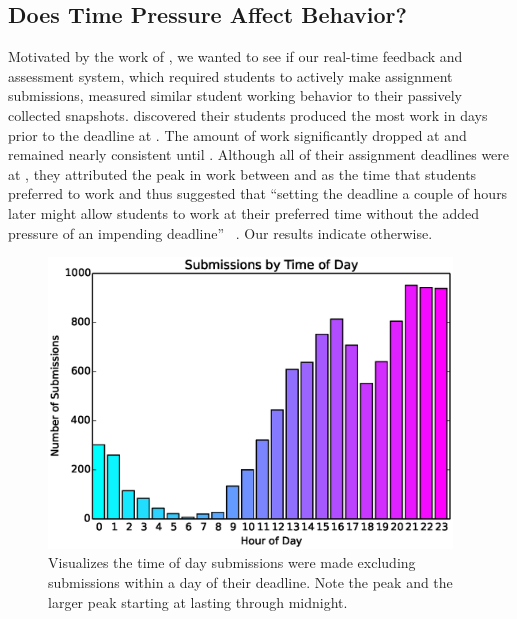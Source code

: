 \subsection{Does Time Pressure Affect Behavior?}

Motivated by the work of \spacco{}, we wanted to see if our real-time feedback
and assessment system, which required students to actively make assignment
submissions, measured similar student working behavior to their passively
collected snapshots. \spacco{} discovered their students produced the most work
in days prior to the deadline at . The amount of work significantly
dropped at  and remained nearly consistent until . Although all of
their assignment deadlines were at , they attributed the peak in work
between  and  as the time that students preferred to work and thus
suggested that ``setting the deadline a couple of hours later might allow
students to work at their preferred time without the added pressure of an
impending deadline'' ~\cite{Spacco:2013:TIP:2462476.2465594}. Our results
indicate otherwise.

\begin{figure}[!t]
\centering
\includegraphics[trim=0 .12in 0 .10in, clip, width=4.215in]{graphs/Submissions_by_Time_of_Day.eps}
\caption{Visualizes the time of day submissions were made excluding submissions
  within a day of their deadline. Note the  peak and the larger peak
  starting at  lasting through midnight.}
\end{figure}

